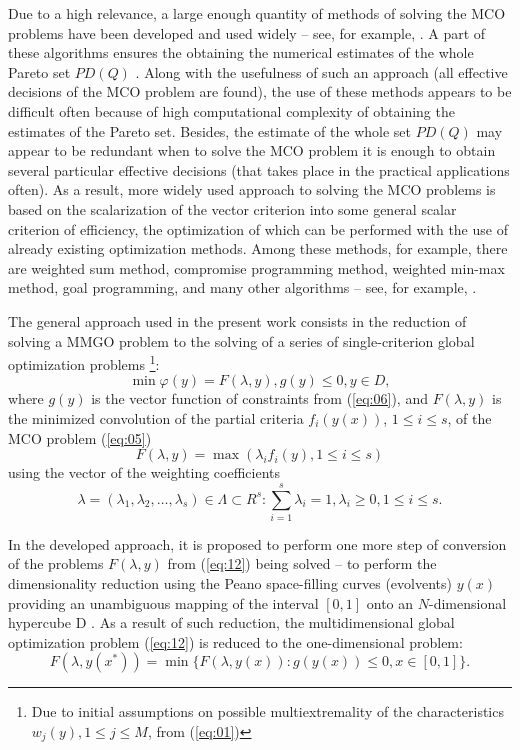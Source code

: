 \documentclass{svproc}
\begin{document}
Due to a high relevance, a large enough quantity of methods of solving the MCO problems have been developed and used widely -- see, for example, \cite{x2,x3,x4,x5,x6,x7,x8,x9,x10}. A part of these algorithms ensures the obtaining the numerical estimates of the whole Pareto set $PD(Q)$ \cite{x3,x26,x27,x28}. Along with the usefulness of such an approach (all effective decisions of the MCO problem are found), the use of these methods appears to be difficult often because of high computational complexity of obtaining the estimates of the Pareto set. Besides, the estimate of the whole set $PD(Q)$ may appear to be redundant when to solve the MCO problem it is enough to obtain several particular effective decisions (that takes place in the practical applications often). As a result, more widely used approach to solving the MCO problems is based on the scalarization of the vector criterion into some general scalar criterion of efficiency, the optimization of which can be performed with the use of already existing optimization methods. Among these methods, for example, there are weighted sum method, compromise programming method, weighted min-max method, goal programming, and many other algorithms -- see, for example, \cite{x2,x3,x4,x5,x6}. 

The general approach used in the present work consists in the reduction of solving a MMGO problem to the solving of a series of single-criterion global optimization problems \footnote{Due to initial assumptions on possible multiextremality of the characteristics $w_j(y), 1 \leq j \leq M$, from (\ref{eq:01})}: 
\begin{equation}
\label{eq:12}
\min {\varphi(y)}=F(\lambda,y), g(y) \leq 0, y \in D, 
\end{equation}
where $g(y)$ is the vector function of constraints from (\ref{eq:06}), and $F(\lambda,y)$ is the minimized convolution of the partial criteria $f_i(y(x))$, $1 \leq i \leq s$, of the MCO problem (\ref{eq:05})
\begin{equation}
\label{eq:13}
F(\lambda,y)=\max{⁡(\lambda_i f_i (y), 1 \leq i \leq s)} 
\end{equation}
using the vector of the weighting coefficients 
\begin{equation}
\label{eq:14}
\lambda=(\lambda_1, \lambda_2, \dots , \lambda_s )\in \Lambda \subset R^s: \sum_{i=1}^s{\lambda_i=1}, \lambda_i \geq 0, 1 \leq i \leq s.
\end{equation}

In the developed approach, it is proposed to perform one more step of conversion of the problems $F(\lambda,y)$ from (\ref{eq:12}) being solved -- to perform the dimensionality reduction using the Peano space-filling curves (evolvents) $y(x)$ providing an unambiguous mapping of the interval $[0,1]$ onto an $N$-dimensional hypercube D \cite{x18,x20}. As a result of such reduction, the multidimensional global optimization problem (\ref{eq:12}) is reduced to the one-dimensional problem:
\begin{equation}
\label{eq:15}
F(\lambda,y(x^*)) = \min{\{F(\lambda,y(x)): g(y(x)) \leq 0, x \in [0,1]\}}.
\end{equation}
\end{document}
